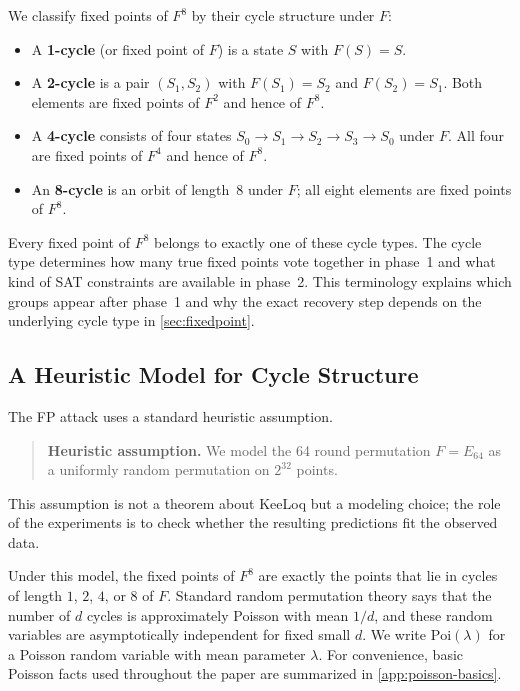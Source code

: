 \documentclass[version=preprint]{iacrcc}
\begin{document}
We classify fixed points of $F^8$ by their cycle structure under $F$:
\begin{itemize}
  \item A \textbf{1-cycle} (or fixed point of $F$) is a state $S$ with $F(S) = S$.
  \item A \textbf{2-cycle} is a pair $(S_1,S_2)$ with $F(S_1)=S_2$ and $F(S_2)=S_1$.
  Both elements are fixed points of $F^2$ and hence of $F^8$.
  \item A \textbf{4-cycle} consists of four states $S_0 \to S_1 \to S_2 \to S_3 \to S_0$ under $F$.
  All four are fixed points of $F^4$ and hence of $F^8$.
  \item An \textbf{8-cycle} is an orbit of length~8 under $F$; all eight elements are fixed points of $F^8$.
\end{itemize}
Every fixed point of $F^8$ belongs to exactly one of these cycle types.
The cycle type determines how many true fixed points vote together in phase~1 and what kind of SAT constraints are available in phase~2.
This terminology explains which groups appear after phase~1 and why the exact recovery step depends on the underlying cycle type in \autoref{sec:fixedpoint}.

\subsection{A Heuristic Model for Cycle Structure}\label{subsec:heuristic-model}

The FP attack uses a standard heuristic assumption.

\begin{quote}
\textbf{Heuristic assumption.}
We model the 64 round permutation $F = E_{64}$ as a uniformly random permutation on $2^{32}$ points.
\end{quote}

This assumption is not a theorem about KeeLoq but a modeling choice;
the role of the experiments is to check whether the resulting predictions fit the observed data.

Under this model, the fixed points of $F^8$ are exactly the points that lie in cycles of length $1$, $2$, $4$, or $8$ of $F$.
Standard random permutation theory says that the number of $d$ cycles is approximately Poisson with mean $1/d$, and these random variables are asymptotically independent for fixed small $d$.
We write $\mathrm{Poi}(\lambda)$ for a Poisson random variable with mean parameter $\lambda$.
For convenience, basic Poisson facts used throughout the paper are summarized in
\autoref{app:poisson-basics}.
\end{document}
